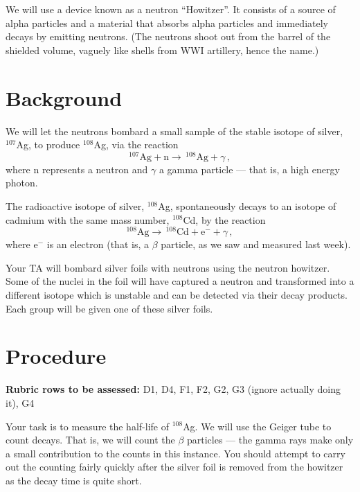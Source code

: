 We will use a device known as a neutron ``Howitzer''. It consists of a source of alpha
particles and a material that absorbs alpha particles and immediately decays by emitting
neutrons. (The neutrons shoot out from the barrel of the shielded volume, vaguely like
shells from WWI artillery, hence the name.)

\section{Background}

We will let the neutrons bombard a small sample of the stable isotope of silver, $^{107}$Ag, to
produce $^{108}$Ag, via the reaction
\begin{equation}
 ^{107}\textrm{Ag} + \mathrm{n} \rightarrow\, ^{108}\textrm{Ag} + \gamma \,,
\end{equation}
where $\mathrm{n}$ represents a neutron and $\gamma$ a gamma particle --- that is, a high energy photon.

The radioactive isotope of silver, $^{108}$Ag, spontaneously decays to an isotope of cadmium
with the same mass number, $^{108}$Cd, by the reaction
\begin{equation}
 ^{108}\textrm{Ag} \rightarrow\, ^{108}\textrm{Cd} + \mathrm{e}^- + \gamma \,,
\end{equation}
where $\mathrm{e}^-$ is an electron (that is, a $\beta$ particle, as we saw and measured last week).

Your TA will bombard silver foils with neutrons using the neutron howitzer. Some of the
nuclei in the foil will have captured a neutron and transformed into a different isotope
which is unstable and can be detected via their decay products. Each group will be given
one of these silver foils.

\section{Procedure}

\textbf{Rubric rows to be assessed:} D1, D4, F1, F2, G2, G3 (ignore actually doing it), G4

Your task is to measure the half-life of $^{108}$Ag. We will use the Geiger tube to count
decays. That is, we will count the $\beta$ particles --- the gamma rays make only a small
contribution to the counts in this instance. You should attempt to carry out the counting
fairly quickly after the silver foil is removed from the howitzer as the decay time is quite
short.

